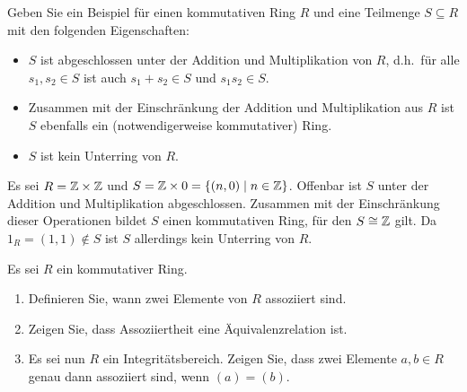 \begin{question}[subtitle = Zur Definition von Unterringen]
  Geben Sie ein Beispiel für einen kommutativen Ring $R$ und eine Teilmenge $S \subseteq R$ mit den folgenden Eigenschaften:
  \begin{itemize}
    \item
      $S$ ist abgeschlossen unter der Addition und Multiplikation von $R$, d.h.\ für alle $s_1, s_2 \in S$ ist auch $s_1 + s_2 \in S$ und $s_1 s_2 \in S$.
    \item
      Zusammen mit der Einschränkung der Addition und Multiplikation aus $R$ ist $S$ ebenfalls ein (notwendigerweise kommutativer) Ring.
    \item
      $S$ ist kein Unterring von $R$.
  \end{itemize}
\end{question}


\begin{solution}
  Es sei $R = \mathbb{Z} \times \mathbb{Z}$ und $S = \mathbb{Z} \times 0 = \{(n,0) \mid n \in \mathbb{Z}\}$.
  Offenbar ist $S$ unter der Addition und Multiplikation abgeschlossen.
  Zusammen mit der Einschränkung dieser Operationen bildet $S$ einen kommutativen Ring, für den $S \cong \mathbb{Z}$ gilt.
  Da $1_R = (1,1) \notin S$ ist $S$ allerdings kein Unterring von $R$.
\end{solution}


\begin{question}
  Es sei $R$ ein kommutativer Ring.
  \begin{enumerate}
    \item
      Definieren Sie, wann zwei Elemente von $R$ assoziiert sind.
    \item
      Zeigen Sie, dass Assoziiertheit eine Äquivalenzrelation ist.
    \item
      Es sei nun $R$ ein Integritätsbereich.
      Zeigen Sie, dass zwei Elemente $a, b \in R$ genau dann assoziiert sind, wenn $(a) = (b)$.
  \end{enumerate}
\end{question}


